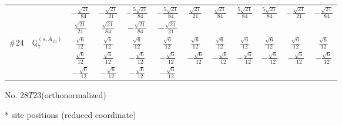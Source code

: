 \documentclass[fleqn,9pt,landscape]{jsarticle}
\begin{document}
\begin{center}
\begin{longtable}{lcccccccccc}
& $ - \frac{\sqrt{21}}{84} $ & $ - \frac{\sqrt{21}}{21} $ & $ - \frac{5 \sqrt{21}}{84} $ & $ - \frac{5 \sqrt{21}}{84} $ & $ \frac{\sqrt{21}}{21} $ & $ \frac{\sqrt{21}}{84} $ & $ \frac{5 \sqrt{21}}{84} $ & $ \frac{5 \sqrt{21}}{84} $ & $ - \frac{\sqrt{21}}{21} $ & $ - \frac{\sqrt{21}}{84} $ \\
& $ \frac{\sqrt{21}}{21} $ & $ \frac{\sqrt{21}}{84} $ & $ - \frac{\sqrt{21}}{84} $ & $ - \frac{\sqrt{21}}{21} $ & $  $ & $  $ & $  $ & $  $ & $  $ & $  $ \\ \hline
$ \#24\quad \mathbb{Q}_{7}^{(s,A_{1u})} $ & $ \frac{\sqrt{6}}{12} $ & $ \frac{\sqrt{6}}{12} $ & $ \frac{\sqrt{6}}{12} $ & $ \frac{\sqrt{6}}{12} $ & $ \frac{\sqrt{6}}{12} $ & $ \frac{\sqrt{6}}{12} $ & $ \frac{\sqrt{6}}{12} $ & $ \frac{\sqrt{6}}{12} $ & $ \frac{\sqrt{6}}{12} $ & $ \frac{\sqrt{6}}{12} $ \\
& $ \frac{\sqrt{6}}{12} $ & $ \frac{\sqrt{6}}{12} $ & $ - \frac{\sqrt{6}}{12} $ & $ - \frac{\sqrt{6}}{12} $ & $ - \frac{\sqrt{6}}{12} $ & $ - \frac{\sqrt{6}}{12} $ & $ - \frac{\sqrt{6}}{12} $ & $ - \frac{\sqrt{6}}{12} $ & $ - \frac{\sqrt{6}}{12} $ & $ - \frac{\sqrt{6}}{12} $ \\
& $ - \frac{\sqrt{6}}{12} $ & $ - \frac{\sqrt{6}}{12} $ & $ - \frac{\sqrt{6}}{12} $ & $ - \frac{\sqrt{6}}{12} $ & $  $ & $  $ & $  $ & $  $ & $  $ & $  $ \\
\end{longtable}
\end{center}
\newpage
\begin{center}
\LARGE
No. 28\quad$T$\quad$23$\quad[ cubic ] (orthonormalized)
\end{center}
\vspace{5mm}
* site positions (reduced coordinate)
\end{document}
